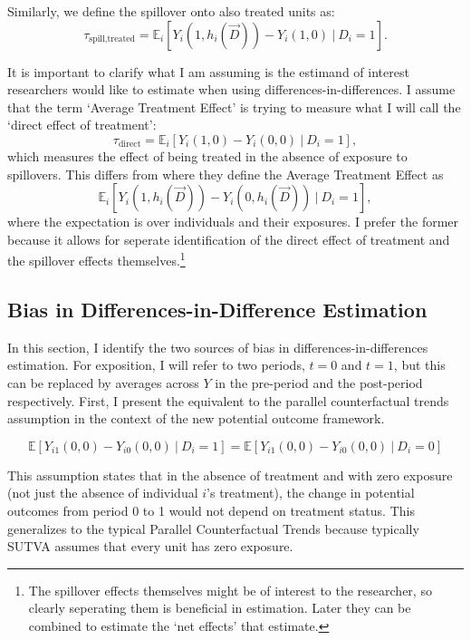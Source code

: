 \documentclass[11pt]{article}
\begin{document}
Similarly, we define the spillover onto also treated units as: \[ 
    \tau_{\text{spill,treated}} = \mathbb{E}_i \left[ Y_{i}(1, h_i(\vec{D})) - Y_{i}(1, 0) \ \vert \ D_i = 1 \right].
\] 

It is important to clarify what I am assuming is the estimand of interest researchers would like to estimate when using differences-in-differences. I assume that the term `Average Treatment Effect' is trying to measure what I will call the `direct effect of treatment': \[
    \tau_{\text{direct}} = \mathbb{E}_i \left[ Y_{i}(1, 0) - Y_{i}(0, 0) \ \vert \ D_i = 1 \right],
\] 
which measures the effect of being treated in the absence of exposure to spillovers. This differs from \citet{Sävje_Aronow_Hudgens_2019} where they define the Average Treatment Effect as \[ 
    \mathbb{E}_i \left[ Y_{i}(1, h_i(\vec{D})) - Y_{i}(0, h_i(\vec{D})) \ \vert \ D_i = 1 \right],
\] 
where the expectation is over individuals and their exposures. I prefer the former because it allows for seperate identification of the direct effect of treatment and the spillover effects themselves.\footnote{The spillover effects themselves might be of interest to the researcher, so clearly seperating them is beneficial in estimation. Later they can be combined to estimate the `net effects' that \citet{Sävje_Aronow_Hudgens_2019} estimate.}


\subsection{Bias in Differences-in-Difference Estimation}

In this section, I identify the two sources of bias in differences-in-differences estimation. For exposition, I will refer to two periods, $t = 0$ and $t = 1$, but this can be replaced by averages across $Y$ in the pre-period and the post-period respectively. First, I present the equivalent to the parallel counterfactual trends assumption in the context of the new potential outcome framework. 

\begin{assumption}\label{parallel}
    \[ 
        \mathbb{E}\left[ Y_{i1}(0, 0) - Y_{i0}(0, 0) \ \vert \ D_i = 1 \right] = 
        \mathbb{E}\left[ Y_{i1}(0, 0) - Y_{i0}(0, 0) \ \vert \ D_i = 0 \right]
    \]
\end{assumption}

This assumption states that in the absence of treatment and with zero exposure (not just the absence of individual $i$'s treatment), the change in potential outcomes from period 0 to 1 would not depend on treatment status. This generalizes to the typical Parallel Counterfactual Trends because typically SUTVA assumes that every unit has zero exposure.
\end{document}
